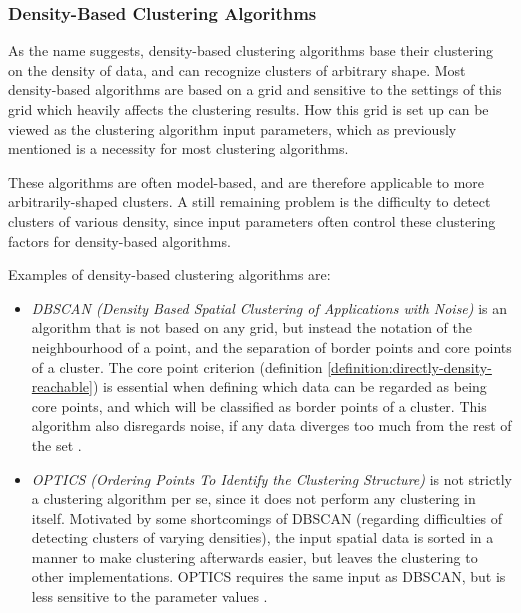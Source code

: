 \subsubsection{Density-Based Clustering Algorithms}
As the name suggests, density-based clustering algorithms base their
clustering on the density of data, and can recognize clusters of 
arbitrary shape. Most density-based algorithms are based on a grid and 
sensitive to the settings of this grid which heavily affects the clustering 
results. How this grid is set up can be viewed as the clustering algorithm 
input parameters, which as previously mentioned is a necessity for most
clustering algorithms.

These algorithms are often model-based, and are therefore applicable to 
more arbitrarily-shaped clusters. A still remaining  problem is the
difficulty to detect clusters of various density, since input parameters 
often control these clustering factors for density-based algorithms.

Examples of density-based clustering algorithms are:
\begin{itemize}
    \item \emph{DBSCAN (Density Based Spatial Clustering of Applications 
        with Noise)} is an algorithm that is not based on any grid, but 
        instead the notation of the neighbourhood of a point, and the 
        separation of border points and core points of a cluster. The 
        core point criterion 
        (definition \ref{definition:directly-density-reachable})
        is essential when defining which data can be regarded as being
        core points, and which will be classified as border points of a
        cluster. This algorithm also disregards noise, if any data diverges
        too much from the rest of the set \cite{DBSCAN}.
    \item \emph{OPTICS (Ordering Points To Identify the Clustering Structure)} 
        is not strictly a clustering algorithm per se, since it does not 
        perform any clustering in itself.
        Motivated by some shortcomings of DBSCAN (regarding difficulties of 
        detecting clusters of varying densities), the input spatial
        data is sorted in a manner to make clustering afterwards easier,
        but leaves the clustering to other implementations.
        OPTICS requires the same input as DBSCAN, but is less sensitive 
        to the parameter values \cite{OPTICS}.
\end{itemize}

